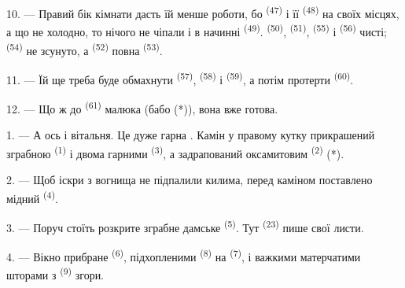 10. --- Правий бік кімнати дасть їй менше роботи, бо 
\textsuperscript{(47)} і її  \textsuperscript{(48)} на своїх
місцях, а що не холодно, то нічого не чіпали і в начинні 
\textsuperscript{(49)}.  \textsuperscript{(50)}, 
\textsuperscript{(51)},  \textsuperscript{(55)} і  \textsuperscript{(56)} чисті; 
\textsuperscript{(54)} не зсунуто, а 
\textsuperscript{(52)} повна  \textsuperscript{(53)}.



11. --- Їй ще треба буде обмахнути 
\textsuperscript{(57)},  \textsuperscript{(58)} і
 \textsuperscript{(59)}, а потім протерти
 \textsuperscript{(60)}.

12. --- Що ж до  \textsuperscript{(61)} малюка (бабо (*)), вона
вже готова.

\VUsaut{5.0mm}
\VUsaut{3.0mm}

1. --- А ось і вітальня. Це дуже гарна . Камін у правому кутку
прикрашений зграбною  \textsuperscript{(1)} і двома гарними
 \textsuperscript{(3)}, а задрапований оксамитовим
 \textsuperscript{(2)} (*).

2. --- Щоб іскри з вогнища не підпалили килима, перед каміном поставлено мідний
 \textsuperscript{(4)}.

3. --- Поруч стоїть розкрите зграбне дамське 
\textsuperscript{(5)}. Тут  \textsuperscript{(23)} пише
свої листи.

4. --- Вікно прибране  \textsuperscript{(6)},
підхопленими  \textsuperscript{(8)} на 
\textsuperscript{(7)}, і важкими матерчатими шторами з 
\textsuperscript{(9)} згори.


